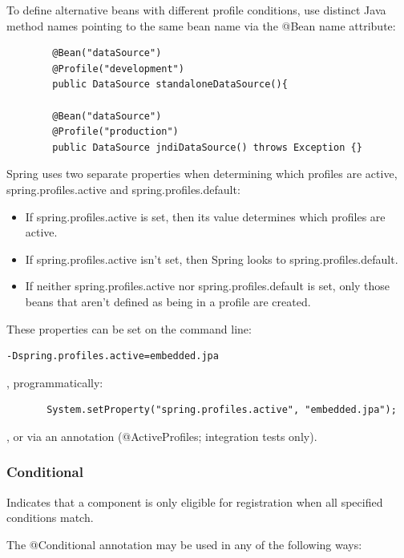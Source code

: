 \documentclass{scrartcl}
\begin{document}
    To define alternative beans with different profile conditions, use distinct Java method names pointing to the same bean name via the @Bean name attribute:

    \begin{lstlisting}
        @Bean("dataSource")
        @Profile("development")
        public DataSource standaloneDataSource(){

        @Bean("dataSource")
        @Profile("production")
        public DataSource jndiDataSource() throws Exception {}

    \end{lstlisting}

   Spring uses two separate properties when determining which profiles are active, spring.profiles.active and spring.profiles.default:

    \begin{itemize}
       \item If spring.profiles.active is set,  then its value determines which profiles are active.
       \item If spring.profiles.active isn’t set, then Spring looks to spring.profiles.default.
       \item If neither spring.profiles.active nor spring.profiles.default is set, only those beans that aren’t defined as being in a profile are created.
    \end{itemize}

   These properties can be set on the command line:

   \begin{lstlisting}[language=bash]
       -Dspring.profiles.active=embedded.jpa
   \end{lstlisting}

   , programmatically:

   \begin{lstlisting}
       System.setProperty("spring.profiles.active", "embedded.jpa");
   \end{lstlisting}

   , or via an annotation (@ActiveProfiles; integration tests only).

\subsubsection{Conditional}

Indicates that a component is only eligible for registration when all specified conditions match.

The @Conditional annotation may be used in any of the following ways:
\end{document}
